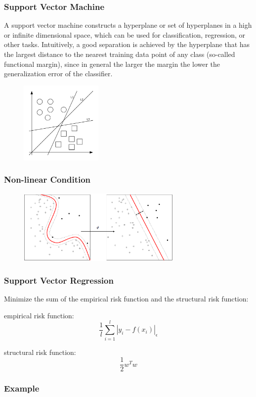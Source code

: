 \documentclass{beamer}
\begin{document}
\begin{frame}
\frametitle{Support Vector Machine}
A support vector machine constructs a hyperplane or set of hyperplanes in a high or infinite dimensional space, which can be used for classification, regression, or other tasks. Intuitively, a good separation is achieved by the hyperplane that has the largest distance to the nearest training data point of any class (so-called functional margin), since in general the larger the margin the lower the generalization error of the classifier.
 \begin{figure}[htbp]
\centering
\includegraphics[width=4cm]{Classifier.png}
\end{figure} 
\end{frame}

\begin{frame}
\frametitle{Non-linear Condition}
\begin{figure}[htbp]
\centering
\includegraphics[width=8cm]{Kernel.png}
\end{figure} 
\end{frame}
 
\begin{frame}
\frametitle{Support Vector Regression}
Minimize the sum of the empirical risk function and the structural risk function:

empirical risk function:
\begin{equation*}
\frac{1}{l}\sum_{i=1}^{l}|y_i-f(x_i)|_\epsilon
\end{equation*}
 
structural risk function:
\begin{equation*}
\frac{1}{2}w^Tw
\end{equation*}
\end{frame}

\begin{frame}
\frametitle{Example}
 
\end{frame}
 
\end{document}
